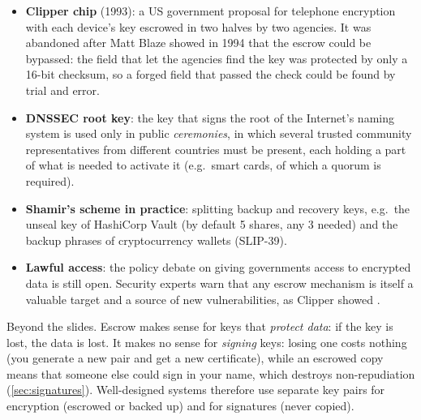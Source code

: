 \begin{itemize}
    \item \textbf{Clipper chip} (1993): a US government proposal for telephone encryption with each device's key escrowed in two halves by two agencies. It was abandoned after Matt Blaze showed in 1994 that the escrow could be bypassed: the field that let the agencies find the key was protected by only a 16-bit checksum, so a forged field that passed the check could be found by trial and error.
    \item \textbf{DNSSEC root key}: the key that signs the root of the Internet's naming system is used only in public \emph{ceremonies}, in which several trusted community representatives from different countries must be present, each holding a part of what is needed to activate it (e.g.\ smart cards, of which a quorum is required).
    \item \textbf{Shamir's scheme in practice}: splitting backup and recovery keys, e.g.\ the unseal key of HashiCorp Vault (by default 5 shares, any 3 needed) and the backup phrases of cryptocurrency wallets (SLIP-39).
    \item \textbf{Lawful access}: the policy debate on giving governments access to encrypted data is still open. Security experts warn that any escrow mechanism is itself a valuable target and a source of new vulnerabilities, as Clipper showed \cite{abelson2015}.
\end{itemize}

\begin{remark}
Beyond the slides. Escrow makes sense for keys that \emph{protect data}: if the key is lost, the data is lost. It makes no sense for \emph{signing} keys: losing one costs nothing (you generate a new pair and get a new certificate), while an escrowed copy means that someone else could sign in your name, which destroys non-repudiation (\cref{sec:signatures}). Well-designed systems therefore use separate key pairs for encryption (escrowed or backed up) and for signatures (never copied).
\end{remark}

